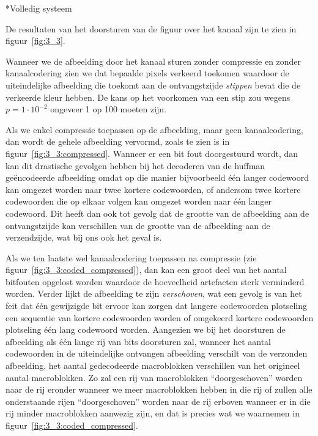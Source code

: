 \documentclass[]{article}
\begin{document}
\begin{section}*{Volledig systeem} %

	De resultaten van het doorsturen van de figuur over het kanaal zijn te zien
	in figuur~\ref{fig:3_3}.
	
	\par
	
	Wanneer we de afbeelding door het kanaal sturen zonder compressie en zonder
	kanaalcodering zien we dat bepaalde pixels verkeerd toekomen waardoor
	de uiteindelijke afbeelding die toekomt aan de ontvangstzijde \emph{stippen}
	bevat die de verkeerde kleur hebben.
	De kans op het voorkomen van een stip zou wegens
	$p = 1 \cdot 10^{-2}$ ongeveer 1 op 100 moeten zijn.
	
	\par
	
	Als we enkel compressie toepassen op de afbeelding, maar geen kanaalcodering,
	dan wordt de gehele afbeelding vervormd, zoals te zien is in 
	figuur~\ref{fig:3_3:compressed}.
	Wanneer er een bit fout doorgestuurd wordt, dan kan dit drastische gevolgen
	hebben bij het decoderen van de huffman ge\"encodeerde afbeelding omdat
	op die manier bijvoorbeeld \'e\'en langer codewoord kan omgezet worden naar 
	twee kortere codewoorden, of andersom twee kortere codewoorden die op elkaar 
	volgen kan omgezet worden naar \'e\'en langer codewoord. 
	Dit heeft dan ook tot gevolg dat de grootte van de afbeelding aan de ontvangstzijde
	kan verschillen van de grootte van de afbeelding aan de verzendzijde, wat bij
	ons ook het geval is.
	
	\par
	
	Als we ten laatste wel kanaalcodering toepassen na compressie 
	(zie figuur~\ref{fig:3_3:coded_compressed}),
	dan kan een groot deel van het aantal bitfouten opgelost worden waardoor
	de hoeveelheid artefacten sterk verminderd worden.
	Verder lijkt de afbeelding te zijn \emph{verschoven}, wat een gevolg is van
	het feit dat \'e\'en gewijzigde bit ervoor kan zorgen dat langere codewoorden
	plotseling een sequentie van kortere codewoorden worden of omgekeerd
	kortere codewoorden plotseling \'e\'en lang codewoord worden.
	Aangezien we bij het doorsturen de afbeelding als \'e\'en lange rij van bits
	doorsturen zal, wanneer het aantal codewoorden in de uiteindelijke ontvangen
	afbeelding verschilt van de verzonden afbeelding, het aantal gedecodeerde macroblokken
	verschillen van het origineel aantal macroblokken. Zo zal een rij van macroblokken
	``doorgeschoven'' worden naar de rij eronder wanneer we meer macroblokken hebben in die rij
	of zullen alle onderstaande rijen ``doorgeschoven'' worden naar de rij erboven
	wanneer er in die rij minder macroblokken aanwezig zijn, en dat is precies wat
	we waarnemen in figuur~\ref{fig:3_3:coded_compressed}.
	

\end{section}
\end{document}
